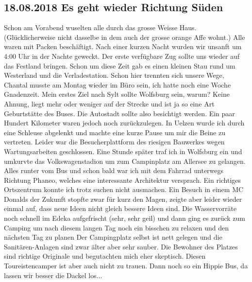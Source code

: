 \subsection{18.08.2018 Es geht wieder Richtung Süden}
Schon am Vorabend wuselten alle durch das grosse Weisse Haus.
(Glücklicherweise nicht dasselbe in dem auch der grosse orange Affe wohnt.)
Alle waren mit Packen beschäftigt.
Nach einer kurzen Nacht wurden wir unsanft um 4:00 Uhr in der Nachte geweckt.
Der erste verfügbare Zug sollte uns wieder auf das Festland bringen.
Schon um diese Zeit gab es einen kleinen Stau rund um Westerland und die Verladestation.
Schon hier trennten sich unsere Wege, Chantal musste am Montag wieder im Büro sein, ich hatte noch eine Woche Gnadenzeit.
Mein erstes Ziel nach Sylt sollte Wolfsburg sein, warum?
Keine Ahnung, liegt mehr oder weniger auf der Strecke und ist ja so eine Art Geburtstätte des Buses.
Die Autostadt sollte also besichtigt werden.
Ein paar Hundert Kilometer waren jedoch noch zurückzulegen.
In Uelzen wurde ich durch eine Schleuse abgelenkt und machte eine kurze Pause um mir die Beine zu vertreten.
Leider war die Besucherplattform des riesigen Bauwerkes wegen Wartungsarbeiten geschlossen. 
Eine Stunde später traf ich in Wolfsburg ein und umkurvte das Volkswagenstadion um zum Campinplatz am Allersee zu gelangen.
Alles runter vom Bus und schon bald war ich mit dem Fahrrad unterwegs Richtung Phaneo, welches eine interessante Architektur versprach.
Ein richtiges Ortszentrum konnte ich trotz suchen nicht ausmachen.
Ein Besuch in einem MC Donalds der Zukunft stopfte zwar für kurz den Magen, zeigte aber leider wieder einmal auf, dass neue Ideen nicht gleich bessere Ideen sind.
Die Wasservorräte noch schnell im Edeka aufgefrischt (sehr, sehr geil) und dann ging es zurück zum Camping um nach diesem langen Tag noch ein bisschen zu relaxen und den nächsten Tag zu planen
Der Campingplatz selbst ist nett gelegen und die Sanitären-Anlagen sind zwar älter aber sehr sauber.
Die \glqq Bewohner\grqq{} des Platzes sind richtige Originale und begutachten mich eher skeptisch. 
Diesen Toureistencamper ist aber auch nicht zu trauen.
Dann noch so ein Hippie Bus, da lassen wir besser die Dackel los...

